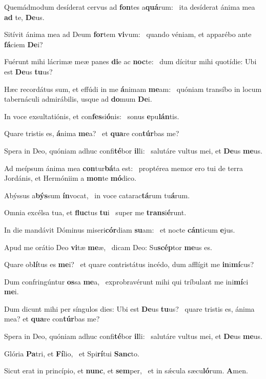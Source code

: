 \item Quemádmodum desíderat cervus ad \textbf{fon}tes a\textbf{quá}rum:~\psstar{} ita desíderat ánima mea \textbf{ad} te, \textbf{De}us.
\item Sitívit ánima mea ad Deum \textbf{for}tem \textbf{vi}vum:~\psstar{} quando véniam, et apparébo ante \textbf{fá}ciem \textbf{De}i?
\item Fuérunt mihi lácrimæ meæ panes \textbf{di}e ac \textbf{noc}te:~\psstar{} dum dícitur mihi quotídie: Ubi est \textbf{De}us \textbf{tu}us?
\item Hæc recordátus sum, et effúdi in me \textbf{á}nimam \textbf{me}am:~\psstar{} quóniam transíbo in locum tabernáculi admirábilis, usque ad \textbf{do}mum \textbf{De}i.
\item In voce exsultatiónis, et con\textbf{fes}si\textbf{ó}nis:~\psstar{} sonus \textbf{e}pu\textbf{lán}tis.
\item Quare tristis es, \textbf{á}nima \textbf{me}a?~\psstar{} et \textbf{qua}re con\textbf{túr}bas me?
\item Spera in Deo, quóniam adhuc confi\textbf{té}bor \textbf{il}li:~\psstar{} salutáre vultus mei, et \textbf{De}us \textbf{me}us.
\item Ad meípsum ánima mea \textbf{con}tur\textbf{bá}ta est:~\psstar{} proptérea memor ero tui de terra Jordánis, et Hermóniim a \textbf{mon}te \textbf{mó}dico.
\item Abýssus a\textbf{býs}sum \textbf{ín}vocat,~\psstar{} in voce catarac\textbf{tá}rum tu\textbf{á}rum.
\item Omnia excélsa tua, et \textbf{fluc}tus \textbf{tu}i~\psstar{} super me \textbf{trans}i\textbf{é}runt.
\item In die mandávit Dóminus miseri\textbf{cór}diam \textbf{su}am:~\psstar{} et nocte \textbf{cán}ticum \textbf{e}jus.
\item Apud me orátio Deo \textbf{vi}tæ \textbf{me}æ,~\psstar{} dicam Deo: Su\textbf{scép}tor \textbf{me}us es.
\item Quare ob\textbf{lí}tus es \textbf{me}i?~\psstar{} et quare contristátus incédo, dum afflígit me \textbf{in}i\textbf{mí}cus?
\item Dum confringúntur \textbf{os}sa \textbf{me}a,~\psstar{} exprobravérunt mihi qui tríbulant me ini\textbf{mí}ci \textbf{me}i.
\item Dum dicunt mihi per síngulos dies: Ubi est \textbf{De}us \textbf{tu}us?~\psstar{} quare tristis es, ánima mea? et \textbf{qua}re con\textbf{túr}bas me?
\item Spera in Deo, quóniam adhuc confi\textbf{té}bor \textbf{il}li:~\psstar{} salutáre vultus mei, et \textbf{De}us \textbf{me}us.
\item Glória \textbf{Pa}tri, et \textbf{Fí}lio,~\psstar{} et Spi\textbf{rí}tui \textbf{Sanc}to.
\item Sicut erat in princípio, et \textbf{nunc}, et \textbf{sem}per,~\psstar{} et in sǽcula sæcu\textbf{ló}rum. \textbf{A}men.
